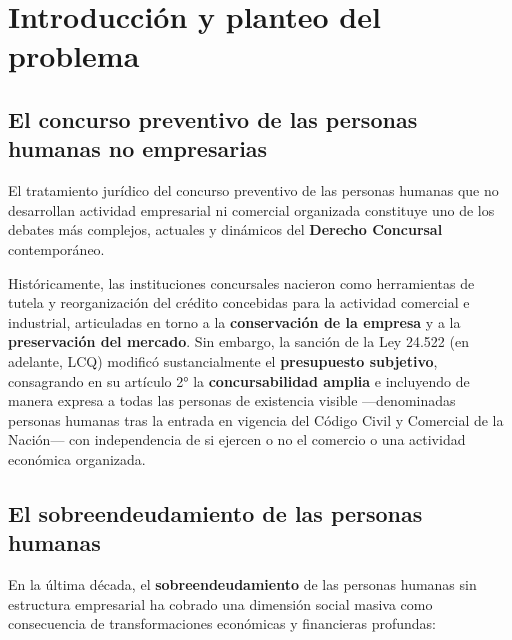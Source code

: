 \documentclass[12pt,oneside]{book}
\begin{document}
\frontmatter
\tableofcontents
\mainmatter


\chapter[Introducción y planteo del problema]{Introducción y planteo del problema}

\section{El concurso preventivo de las personas humanas no empresarias}

El tratamiento jurídico del concurso preventivo de las personas humanas que no desarrollan actividad empresarial ni comercial organizada constituye uno de los debates más complejos, actuales y dinámicos del \textbf{Derecho Concursal} contemporáneo.

Históricamente, las instituciones concursales nacieron como herramientas de tutela y reorganización del crédito concebidas para la actividad comercial e industrial, articuladas en torno a la \textbf{conservación de la empresa} y a la \textbf{preservación del mercado}. Sin embargo, la sanción de la Ley 24.522 (en adelante, LCQ) modificó sustancialmente el \textbf{presupuesto subjetivo}, consagrando en su artículo 2° la \textbf{concursabilidad amplia} e incluyendo de manera expresa a todas las personas de existencia visible ---denominadas personas humanas tras la entrada en vigencia del Código Civil y Comercial de la Nación--- con independencia de si ejercen o no el comercio o una actividad económica organizada.

\section{El sobreendeudamiento de las personas humanas}

En la última década, el \textbf{sobreendeudamiento} de las personas humanas sin estructura empresarial ha cobrado una dimensión social masiva como consecuencia de transformaciones económicas y financieras profundas:
\end{document}
